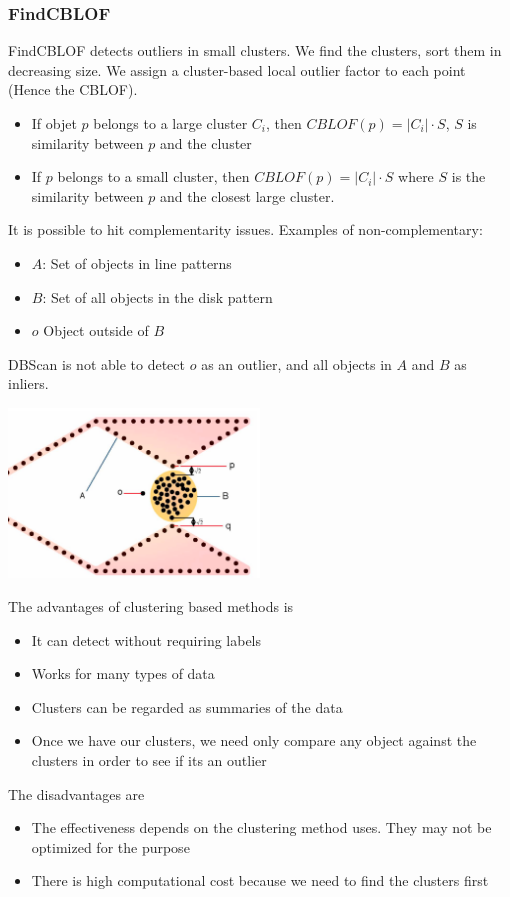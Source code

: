 \subsubsection{FindCBLOF}
    FindCBLOF detects outliers in small clusters. We find the clusters, sort them in decreasing size. We assign a cluster-based local outlier factor to each point (Hence the CBLOF).
    
    \begin{itemize}
        \item If objet $p$ belongs to a large cluster $C_i$, then $CBLOF(p) = |C_i| \cdot S$, $S$ is similarity between $p$ and the cluster
        \item If $p$ belongs to a small cluster, then $CBLOF(p) = |C_i| \cdot S$ where $S$ is the similarity between $p$ and the closest large cluster.
    \end{itemize}
    
    It is possible to hit complementarity issues. Examples of non-complementary:
    \begin{itemize}
        \item $A$: Set of objects in line patterns
        \item $B$: Set of all objects in the disk pattern
        \item $o$ Object outside of $B$
    \end{itemize}
    DBScan is not able to detect $o$ as an outlier, and all objects in $A$ and $B$ as inliers. 
    
    \begin{center}
        \includegraphics[width=0.5\textwidth]{images/noncomplement.png}
    \end{center}
    
    The advantages of clustering based methods is
    \begin{itemize}
        \item It can detect without requiring labels
        \item Works for many types of data
        \item Clusters can be regarded as summaries of the data
        \item Once we have our clusters, we need only compare any object against the clusters in order to see if its an outlier
    \end{itemize}
    The disadvantages are
    \begin{itemize}
        \item The effectiveness depends on the clustering method uses. They may not be optimized for the purpose
        \item There is high computational cost because we need to find the clusters first
    \end{itemize}
    
